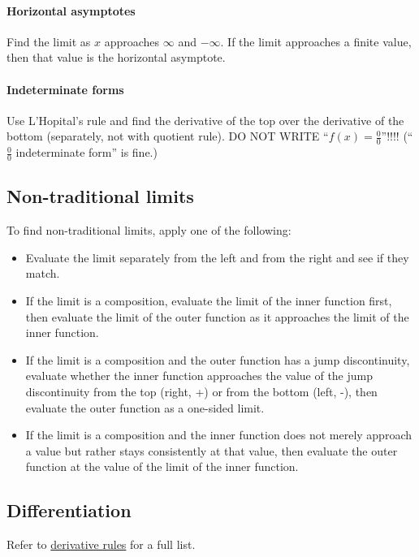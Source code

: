 \documentclass[letterpaper, 12pt]{article}
\begin{document}
\paragraph{Horizontal asymptotes} Find the limit as $x$ approaches $\infty$ and $-\infty$. If the limit approaches a finite value, then that value is the horizontal asymptote.

\paragraph{Indeterminate forms} Use L'Hopital's rule and find the derivative of the top over the derivative of the bottom (separately, not with quotient rule). DO NOT WRITE ``$f(x) = \frac{0}{0}$''!!!! (``$\frac{0}{0}$ indeterminate form'' is fine.)

\subsection*{Non-traditional limits}

To find non-traditional limits, apply one of the following:

\begin{itemize}
\item Evaluate the limit separately from the left and from the right and see if they match.
\item If the limit is a composition, evaluate the limit of the inner function first, then evaluate the limit of the outer function as it approaches the limit of the inner function.
\item If the limit is a composition and the outer function has a jump discontinuity, evaluate whether the inner function approaches the value of the jump discontinuity from the top (right, +) or from the bottom (left, -), then evaluate the outer function as a one-sided limit.
\item If the limit is a composition and the inner function does not merely approach a value but rather stays consistently at that value, then evaluate the outer function at the value of the limit of the inner function.
\end{itemize}

\subsection*{Differentiation}

Refer to \href{https://www.mathsisfun.com/calculus/derivatives-rules.html}{derivative rules} for a full list.
\end{document}
